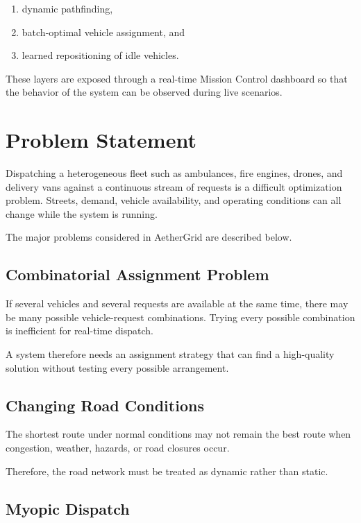 \documentclass[12pt,a4paper]{article}
\begin{document}
\begin{enumerate}
    \item dynamic pathfinding,
    \item batch-optimal vehicle assignment, and
    \item learned repositioning of idle vehicles.
\end{enumerate}

These layers are exposed through a real-time Mission Control
dashboard so that the behavior of the system can be observed during
live scenarios.





\section{Problem Statement}

Dispatching a heterogeneous fleet such as ambulances, fire engines,
drones, and delivery vans against a continuous stream of requests is
a difficult optimization problem. Streets, demand, vehicle
availability, and operating conditions can all change while the
system is running.

The major problems considered in AetherGrid are described below.

\subsection{Combinatorial Assignment Problem}

If several vehicles and several requests are available at the same
time, there may be many possible vehicle-request combinations.
Trying every possible combination is inefficient for real-time
dispatch.

A system therefore needs an assignment strategy that can find a
high-quality solution without testing every possible arrangement.

\subsection{Changing Road Conditions}

The shortest route under normal conditions may not remain the best
route when congestion, weather, hazards, or road closures occur.

Therefore, the road network must be treated as dynamic rather than
static.

\subsection{Myopic Dispatch}
\end{document}
